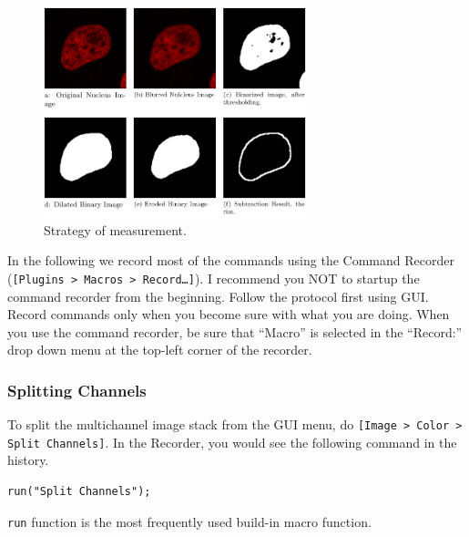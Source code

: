 \documentclass[11pt,a4paper,oneside]{report}
\newcommand{\ijmenu}[1]{\texttt{\small#1}}
\newcommand{\ilcom}[1]{\texttt{\small#1}}
\begin{document}
\begin{figure}[h!]
\centering
\includegraphics[width=3in]{nucsegfig-nucsegProc.pdf}

 \caption{Strategy of measurement.}

 \label{fig:nucsegProc}
\end{figure}



In the following we record most of the commands using the Command Recorder (\ijmenu{[Plugins > Macros > Record\ldots]}). I recommend you NOT to startup the command recorder from the beginning. Follow the protocol first using GUI. Record commands only when you become sure with what you are doing. When you use the command recorder, be sure that ``Macro'' is selected in the ``Record:'' drop down menu at the top-left corner of the recorder.

\subsubsection{Splitting Channels}

To split the multichannel image stack from the GUI menu, do \ilcom{[Image > Color > Split Channels]}. In the Recorder, you would see the following command in the history. 
\begin{lstlisting}[numbers=none]
run("Split Channels");
\end{lstlisting}

\ilcom{run} function is the most frequently used build-in macro function. 

\end{document}
